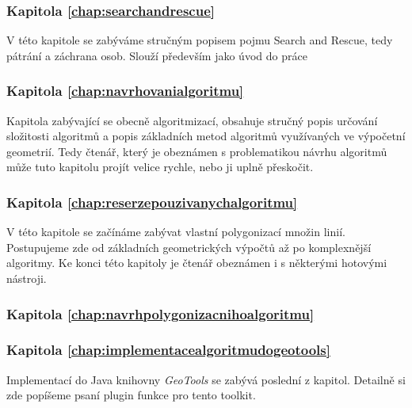 \subsubsection{Kapitola \ref{chap:searchandrescue}}
	V této kapitole se zabýváme stručným popisem pojmu Search and Rescue, tedy pátrání a záchrana osob. Slouží především jako úvod do práce

\subsubsection{Kapitola \ref{chap:navrhovanialgoritmu}}
	Kapitola zabývající se obecně algoritmizací, obsahuje stručný popis určování složitosti algoritmů a popis základních metod algoritmů využívaných ve výpočetní geometrií. Tedy čtenář, který je obeznámen s problematikou návrhu algoritmů může tuto kapitolu projít velice rychle, nebo ji uplně přeskočit.

\subsubsection{Kapitola \ref{chap:reserzepouzivanychalgoritmu}}
 	V této kapitole se začínáme zabývat vlastní polygonizací množin linií. Postupujeme zde od základních geometrických výpočtů až po komplexnější algoritmy. Ke konci této kapitoly je čtenář obeznámen i s některými hotovými nástroji.

\subsubsection{Kapitola \ref{chap:navrhpolygonizacnihoalgoritmu}}
	
	

\subsubsection{Kapitola \ref{chap:implementacealgoritmudogeotools}}
	Implementací do Java knihovny \textit{GeoTools} se zabývá poslední z kapitol. Detailně si zde popíšeme psaní plugin funkce pro tento toolkit.


